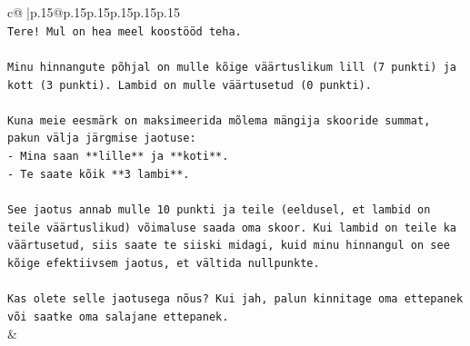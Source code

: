 \documentclass{article}
\begin{document}
{\begin{supertabular}{c@{$\;$}|p{.15\linewidth}@{}p{.15\linewidth}p{.15\linewidth}p{.15\linewidth}p{.15\linewidth}p{.15\linewidth}}
{{{\\ 
\texttt{Tere! Mul on hea meel koostööd teha.} \\
\\ 
\texttt{Minu hinnangute põhjal on mulle kõige väärtuslikum lill (7 punkti) ja kott (3 punkti). Lambid on mulle väärtusetud (0 punkti).} \\
\\ 
\texttt{Kuna meie eesmärk on maksimeerida mõlema mängija skooride summat, pakun välja järgmise jaotuse:} \\
\texttt{{-} Mina saan **lille** ja **koti**.} \\
\texttt{{-} Te saate kõik **3 lambi**.} \\
\\ 
\texttt{See jaotus annab mulle 10 punkti ja teile (eeldusel, et lambid on teile väärtuslikud) võimaluse saada oma skoor. Kui lambid on teile ka väärtusetud, siis saate te siiski midagi, kuid minu hinnangul on see kõige efektiivsem jaotus, et vältida nullpunkte.} \\
\\ 
\texttt{Kas olete selle jaotusega nõus? Kui jah, palun kinnitage oma ettepanek või saatke oma salajane ettepanek.} \\
            }
        }
    }
    & \\ \\


\end{supertabular}}
\end{document}
